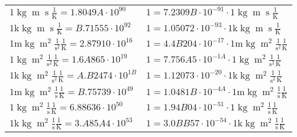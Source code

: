 \begin{center}
\begin{longtable}{l l}
{\color{black}$1 \bm{\mathrm{ }}\operatorname{kg}{\operatorname{m}}{\operatorname{s}}{}\frac1{\operatorname{K}} = 1.8049A\cdot10^{90} $}   & {\color{black}$ 1 = 7.2309B\cdot10^{-91} \cdot 1 \bm{\mathrm{ }}\operatorname{kg}{\operatorname{m}}{\operatorname{s}}{}\frac1{\operatorname{K}}$}  \\
{\color{gray}$1 \bm{\mathrm{ k}}\operatorname{kg}{\operatorname{m}}{\operatorname{s}}{}\frac1{\operatorname{K}} = B.71555\cdot10^{92} $}   & {\color{gray}$ 1 = 1.05072\cdot10^{-93} \cdot 1 \bm{\mathrm{ k}}\operatorname{kg}{\operatorname{m}}{\operatorname{s}}{}\frac1{\operatorname{K}}$}  \\
{\color{gray}$1 \bm{\mathrm{ m}}\operatorname{kg}{\operatorname{m}^2}\frac1{\operatorname{s}^2}{}\frac1{\operatorname{K}} = 2.87910\cdot10^{16} $}   & {\color{gray}$ 1 = 4.4B204\cdot10^{-17} \cdot 1 \bm{\mathrm{ m}}\operatorname{kg}{\operatorname{m}^2}\frac1{\operatorname{s}^2}{}\frac1{\operatorname{K}}$}  \\
{\color{black}$1 \bm{\mathrm{ }}\operatorname{kg}{\operatorname{m}^2}\frac1{\operatorname{s}^2}{}\frac1{\operatorname{K}} = 1.6A865\cdot10^{19} $}   & {\color{black}$ 1 = 7.756A5\cdot10^{-1A} \cdot 1 \bm{\mathrm{ }}\operatorname{kg}{\operatorname{m}^2}\frac1{\operatorname{s}^2}{}\frac1{\operatorname{K}}$}  \\
{\color{gray}$1 \bm{\mathrm{ k}}\operatorname{kg}{\operatorname{m}^2}\frac1{\operatorname{s}^2}{}\frac1{\operatorname{K}} = A.B2474\cdot10^{1B} $}   & {\color{gray}$ 1 = 1.12073\cdot10^{-20} \cdot 1 \bm{\mathrm{ k}}\operatorname{kg}{\operatorname{m}^2}\frac1{\operatorname{s}^2}{}\frac1{\operatorname{K}}$}  \\
{\color{gray}$1 \bm{\mathrm{ m}}\operatorname{kg}{\operatorname{m}^2}\frac1{\operatorname{s}}{}\frac1{\operatorname{K}} = B.75739\cdot10^{49} $}   & {\color{gray}$ 1 = 1.0481B\cdot10^{-4A} \cdot 1 \bm{\mathrm{ m}}\operatorname{kg}{\operatorname{m}^2}\frac1{\operatorname{s}}{}\frac1{\operatorname{K}}$}  \\
{\color{black}$1 \bm{\mathrm{ }}\operatorname{kg}{\operatorname{m}^2}\frac1{\operatorname{s}}{}\frac1{\operatorname{K}} = 6.88636\cdot10^{50} $}   & {\color{black}$ 1 = 1.94B04\cdot10^{-51} \cdot 1 \bm{\mathrm{ }}\operatorname{kg}{\operatorname{m}^2}\frac1{\operatorname{s}}{}\frac1{\operatorname{K}}$}  \\
{\color{gray}$1 \bm{\mathrm{ k}}\operatorname{kg}{\operatorname{m}^2}\frac1{\operatorname{s}}{}\frac1{\operatorname{K}} = 3.A85A4\cdot10^{53} $}   & {\color{gray}$ 1 = 3.0BB57\cdot10^{-54} \cdot 1 \bm{\mathrm{ k}}\operatorname{kg}{\operatorname{m}^2}\frac1{\operatorname{s}}{}\frac1{\operatorname{K}}$}  \\

\end{longtable}
\end{center}
